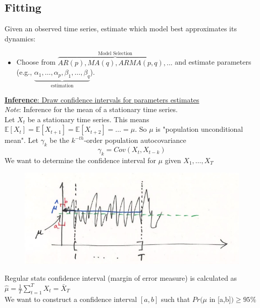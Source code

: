 \subsection{Fitting}

Given an observed time series, estimate which model best approximates its dynamics:\\
\begin{itemize}
    \item Choose from $\overbrace{AR(p),MA(q),ARMA(p,q),...}^\text{Model Selection}$ and estimate parameters (e.g., $\underbrace{\alpha_1,\ldots, \alpha_p, \beta_1,\ldots,\beta_q}_\text{estimation}$).
\end{itemize}

\underline{\textbf{Inference}: Draw confidence intervals for parameters estimates} \\

\textit{Note}: Inference for the mean of a stationary time series.\\

Let $X_t$ be a stationary time series. This means $\mathbb{E}[X_t]=\mathbb{E}[X_{t+1}]=\mathbb{E}[X_{t+2}]=\ldots=\mu $. So $\mu$ is "population unconditional mean". Let $\gamma_k$ be the $k^{-th}$-order population autocovariance
\[
\gamma_k=Cov(X_t,X_{t-k})
\]
We want to determine the confidence interval for $\mu$ given $X_1,\ldots,X_T$

\begin{figure}[H]
\includegraphics[scale=0.4]{images/Screenshot 2024-03-31 at 16.34.09.jpg}
\centering
\end{figure}

Regular stats confidence interval (margin of error measure) is calculated as $\hat{\mu}=\frac{1}{T}\sum_{t=1}^T X_t=\bar{X}_T$\\

We want to construct a confidence interval $[a,b]$ such that $Pr(\mu$ in [a,b]$) \geq 95\%$ \\

